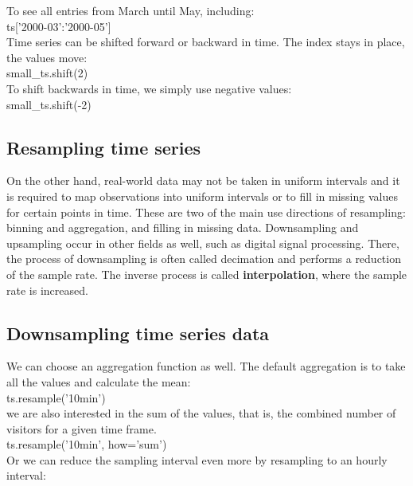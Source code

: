 \documentclass{article}
\numberwithin{equation}{section} %
\begin{document}
To see all entries from March until May, including: \\

ts['2000-03':'2000-05'] \\

Time series can be shifted forward or backward in time. The index stays in place,
the values move: \\

small\_ts.shift(2) \\

To shift backwards in time, we simply use negative values: \\

small\_ts.shift(-2) \\


\subsection*{Resampling time series}

 On the
other hand, real-world data may not be taken in uniform intervals and it is required
to map observations into uniform intervals or to fill in missing values for certain
points in time. These are two of the main use directions of resampling: binning
and aggregation, and filling in missing data. Downsampling and upsampling
occur in other fields as well, such as digital signal processing. There, the process of downsampling is often called decimation and performs a reduction of the sample
rate. The inverse process is called \textbf{interpolation}, where the sample rate is increased.


\subsection*{Downsampling time series data}

We can choose an aggregation function as well. The default aggregation is to take all the values and calculate the mean: \\

ts.resample('10min') \\

we are also interested in the sum of the values, that is, the combined number of visitors for a given time frame. \\

ts.resample('10min', how='sum') \\

Or we can reduce the sampling interval even more by resampling to an hourly interval: \\
\end{document}

